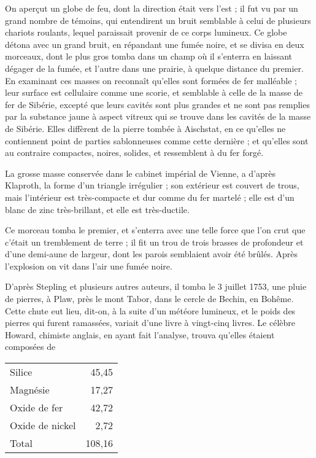 \documentclass[a4paper, 12pt, oneside, french]{article}
\begin{document}
On aperçut un globe de feu, dont la direction était vers l'est ; il fut vu par un grand nombre de témoins, qui entendirent un bruit semblable à celui de plusieurs chariots roulants, lequel paraissait provenir de ce corps lumineux. Ce globe détona avec un grand bruit, en répandant une fumée noire, et se divisa en deux morceaux, dont le plus gros tomba dans un champ où il s'enterra en laissant dégager de la fumée, et l'autre dans une prairie, à quelque distance du premier. En examinant ces masses on reconnaît qu'elles sont formées de fer malléable ; leur surface est cellulaire comme une scorie, et semblable à celle de la masse de fer de Sibérie, excepté que leurs cavités sont plus grandes et ne sont pas remplies par la substance jaune à aspect vitreux qui se trouve dans les cavités de la masse de Sibérie. Elles diffèrent de la pierre tombée à Aischstat, en ce qu'elles ne contiennent point de parties sablonneuses comme cette dernière ; et qu'elles sont au contraire compactes, noires, solides, et ressemblent à du fer forgé.

La grosse masse conservée dans le cabinet impérial de Vienne, a d'après Klaproth, la forme d'un triangle irrégulier ; son extérieur est couvert de trous, mais l'intérieur est très-compacte et dur comme du fer martelé ; elle est d'un blanc de zinc très-brillant, et elle est très-ductile.

Ce morceau tomba le premier, et s'enterra avec une telle force que l'on crut que c'était un tremblement de terre ; il fit un trou de trois brasses de profondeur et d'une demi-aune de largeur, dont les parois semblaient avoir été brûlés. Après l'explosion on vit dans l'air une fumée noire.

D'après Stepling et plusieurs autres auteurs, il tomba le 3 juillet 1753, une pluie de pierres, à Plaw, près le mont Tabor, dans le cercle de Bechin, en Bohême. Cette chute eut lieu, dit-on, à la suite d'un météore lumineux, et le poids des pierres qui furent ramassées, variait d'une livre à vingt-cinq livres. Le célèbre Howard, chimiste anglais, en ayant fait l'analyse, trouva qu'elles étaient composées de
\begin{table}[H]
    \centering
    \Fontauri
    \large
    \begin{tabular}{l r}
        Silice & 45,45 \\
        Magnésie & 17,27 \\
        Oxide de fer & 42,72 \\
        Oxide de nickel & 2,72 \\ \hline
        Total & 108,16 \\
    \end{tabular}
\end{table}
\end{document}

